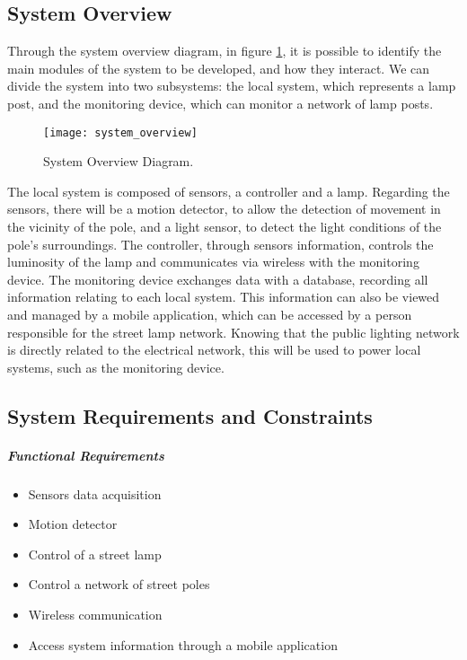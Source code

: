 \subsection{System Overview}
Through the system overview diagram, in figure \ref{fig:system_overview}, it is possible to identify the main modules of the system to be developed, and how they interact. We can divide the system into two subsystems: the local system, which represents a lamp post, and the monitoring device, which can monitor a network of lamp posts.

\begin{figure}[ht]
	\centering
	\texttt{[image: system\_overview]}
	\caption{System Overview Diagram.}
	\label{fig:system_overview}
\end{figure}

The local system is composed of sensors, a controller and a lamp. Regarding the sensors, there will be a motion detector, to allow the detection of movement in the vicinity of the pole, and a light sensor, to detect the light conditions of the pole’s surroundings. The controller, through sensors information, controls the luminosity of the lamp and communicates via wireless with the monitoring device. The monitoring device exchanges data with a database, recording all information relating to each local system. This information can also be viewed and managed by a mobile application, which can be accessed by a person responsible for the street lamp network. Knowing that the public lighting network is directly related to the electrical network, this will be used to power local systems, such as the monitoring device.

\subsection{System Requirements and Constraints}

\subparagraph{Functional Requirements}
\begin{itemize}
	\item Sensors data acquisition				\item Motion detector
	\item Control of a street lamp
	\item Control a network of street poles		\item Wireless communication
	\item Access system information through a mobile application
\end{itemize}

